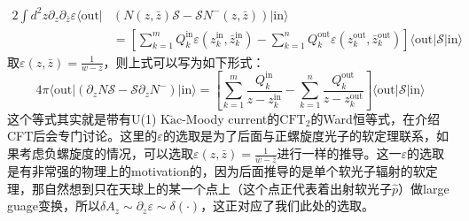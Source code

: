 \begin{equation}\label{eq:25.4}
	\begin{aligned}
		2\int d^2z\partial_z\partial_{\bar{z}}\varepsilon\langle\text{out}|&\left(N(z,\bar{z})\mathcal{S}-\mathcal{S}N^-(z,\bar{z})\right)|\text{in}\rangle\\&=\left[\sum_{k=1}^mQ_k^\text{in}\varepsilon(z_k^\text{in},\bar{z}_k^\text{in})-\sum_{k=1}^nQ_k^\text{out}\varepsilon(z_k^\text{out},{\bar{z}}_k^\text{out})\right]\langle\text{out}|\mathcal{S}|\text{in}\rangle
	\end{aligned}
\end{equation}
取$\varepsilon(z,\bar z)=\frac{1}{w-z}$，则上式可以写为如下形式：
\begin{equation}\label{eq:24.5}
	4\pi\langle\mathrm{out}|\left(\partial_zN\mathcal{S}-\mathcal{S}\partial_zN^-\right)|\mathrm{in}\rangle=\left[\sum_{k=1}^m\frac{Q_k^\mathrm{in}}{z-z_k^\mathrm{in}}-\sum_{k=1}^n\frac{Q_k^\mathrm{out}}{z-z_k^\mathrm{out}}\right]\langle\mathrm{out}|\mathcal{S}|\mathrm{in}\rangle 
\end{equation}
这个等式其实就是带有U(1) K$\breve{\text{a}}$c-Moody current的$\text{CFT}_2$的Ward恒等式\cite{Blumenhagen:2009zz,He:2015zea,Strominger:2013lka,Nande:2017dba}，在介绍CFT后会专门讨论。这里的$\varepsilon$的选取是为了后面与正螺旋度光子的软定理联系，如果考虑负螺旋度的情况，可以选取$\varepsilon(z,\bar z)=\frac{1}{\bar w-\bar z}$进行一样的推导。这一$\varepsilon$的选取是有非常强的物理上的motivation的，因为后面推导的是单个软光子辐射的软定理，那自然想到只在天球上的某一个点上（这个点正代表着出射软光子$\hat p$）做large guage变换，所以$\delta A_z\sim\partial_z\varepsilon\sim\delta(\cdot)$，这正对应了我们此处的选取。

